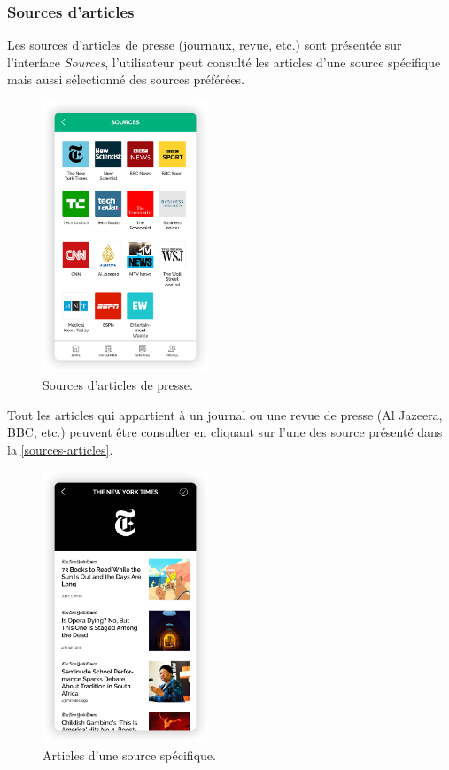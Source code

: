     \subsubsection{Sources d'articles}
    Les sources d'articles de presse (journaux, revue, etc.) sont présentée sur l'interface \emph{Sources}, l'utilisateur peut consulté les articles d'une source spécifique mais aussi sélectionné des sources préférées.
        \begin{figure}[H]
            \centering
            \includegraphics[width=140pt]{img/chapter4/feedny/en-sources.png}
            \caption{Sources d'articles de presse.}
        \end{figure}

    Tout les articles qui appartient à un journal ou une revue de presse (Al Jazeera, BBC, etc.) peuvent être consulter en cliquant sur l'une des source présenté dans la \autoref{sources-articles}.
        \begin{figure}[H]
            \centering
            \includegraphics[width=140pt]{img/chapter4/feedny/en-articles-sources.png}
            \caption{Articles d'une source spécifique.}
            \label{sources-articles}
        \end{figure}


